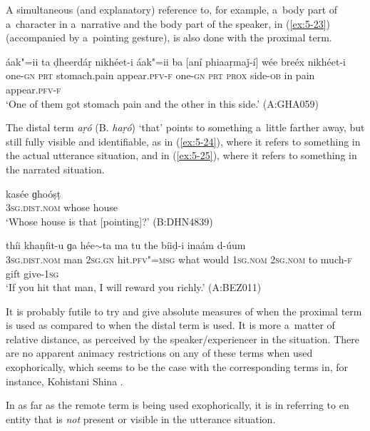 A simultaneous (and explanatory) reference to, for example, a~body part of a~character in a~narrative and the body part of the speaker, in (\ref{ex:5-23}) (accompanied by a~pointing gesture), is also done with the proximal term.


\begin{exe}
\ex
\label{ex:5-23}
\gll áak"=ii ta ḍheerdáṛ nikhéet-i áak"=ii ba [aní phiaaṛmaǰ-í] wée
breéx nikhéet-i \\
one-\textsc{gn} \textsc{prt} stomach.pain appear.\textsc{pfv-f} one-\textsc{gn} \textsc{prt}
\textsc{prox} side-\textsc{ob} in pain appear.\textsc{pfv-f} \\
\glt `One of them got stomach pain and the other in this side.' (A:GHA059)
\end{exe}
The distal term \textit{aṛó} (B. \textit{haṛó}) `that' points to something a~little farther away, but still fully visible and identifiable, as in (\ref{ex:5-24}), where it refers to something in the actual utterance situation, and in (\ref{ex:5-25}), where it refers to something in the narrated situation. 

\begin{exe}
\ex
\label{ex:5-24}
\gll [haṛó] kasée ɡhoóṣṭ \\
\textsc{3sg}.\textsc{dist.nom} whose house \\
\glt `Whose house is that [pointing]?' (B:DHN4839)

\ex
\label{ex:5-25}
 thíi khaṇíit-u ɡa hée$\sim$ta ma tu the bíiḍ-i inaám d-úum \\
\textsc{3sg.dist.nom} man \textsc{2sg.gn} hit.\textsc{pfv"=msg} what would \textsc{1}\textsc{sg.nom} 
\textsc{2sg.nom} to much-\textsc{f} gift give-\textsc{1}\textsc{sg} \\
\glt `If you hit that man, I will reward you richly.' (A:BEZ011)
\end{exe}
It is probably futile to try and give absolute measures of when the proximal term is used as compared to when the distal term is used. It is more a~matter of relative distance, as perceived by the speaker/experiencer in the situation. There are no apparent animacy restrictions on any of these terms when used exophorically, which seems to be the case with the corresponding terms in, for instance, Kohistani Shina \citep[135]{schmidtkohistani2001}.

In as far as the remote term is being used exophorically, it is in referring to en entity that is \textit{not} present or visible in the utterance situation. 



